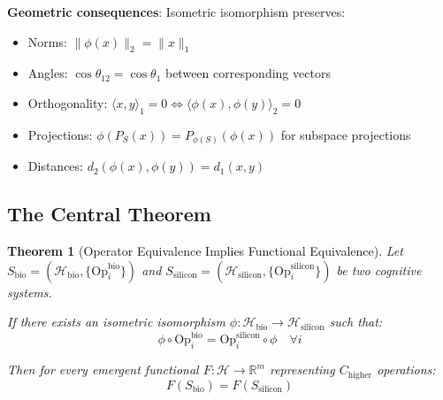 \documentclass[11pt]{article}
\newtheorem{theorem}{Theorem}[section]
\begin{document}
\textbf{Geometric consequences}: Isometric isomorphism preserves:
\begin{itemize}
\item Norms: $\|\phi(x)\|_2 = \|x\|_1$
\item Angles: $\cos \theta_{12} = \cos \theta_1$ between corresponding vectors
\item Orthogonality: $\langle x,y \rangle_1 = 0 \Leftrightarrow \langle \phi(x), \phi(y) \rangle_2 = 0$
\item Projections: $\phi(P_S(x)) = P_{\phi(S)}(\phi(x))$ for subspace projections
\item Distances: $d_2(\phi(x), \phi(y)) = d_1(x,y)$
\end{itemize}

\subsection{The Central Theorem}

\begin{theorem}[Operator Equivalence Implies Functional Equivalence]\label{thm:operator_equiv}
Let $S_{\text{bio}} = (\mathcal{H}_{\text{bio}}, \{\text{Op}_i^{\text{bio}}\})$ and $S_{\text{silicon}} = (\mathcal{H}_{\text{silicon}}, \{\text{Op}_i^{\text{silicon}}\})$ be two cognitive systems.

If there exists an isometric isomorphism $\phi : \mathcal{H}_{\text{bio}} \to \mathcal{H}_{\text{silicon}}$ such that:
\[
\phi \circ \text{Op}_i^{\text{bio}} = \text{Op}_i^{\text{silicon}} \circ \phi \quad \forall i
\]

Then for every emergent functional $F : \mathcal{H} \to \mathbb{R}^m$ representing $C_{\text{higher}}$ operations:
\[
F(S_{\text{bio}}) = F(S_{\text{silicon}})
\]
\end{theorem}
\end{document}
